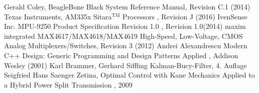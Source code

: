 \begin{thebibliography}{999}
 Gerald Coley, \glqq BeagleBone Black System Reference Manual\grqq , Revision C.1 (2014)
 Texas Instruments, \glqq AM335x Sitara$^{\text{TM}}$ Processors \grqq, Revision J (2016)
 IvenSense Inc. \glqq MPU-9250 Product Specification Revision 1.0 \grqq, Revision 1.0(2014)
 maxim integrated \glqq MAX4617/MAX4618/MAX4619 High-Speed, Low-Voltage, CMOS Analog Multiplexers/Switches\grqq, Revision 3 (2012)
 Andrei Alexandrescu \glqq Modern C++ Design: Generic Programming and Design Patterns Applied \grqq, Addison Wesley (2001)
 Karl Brammer, Gerhard Siffling \glqq Kalman-Bucy-Filter\grqq, 4. Auflage
 Seigfried Hans Saenger Zetina, \glqq Optimal Control with Kane Mechanics Applied to a Hybrid Power Split Transmission \grqq , 2009


\end{thebibliography}